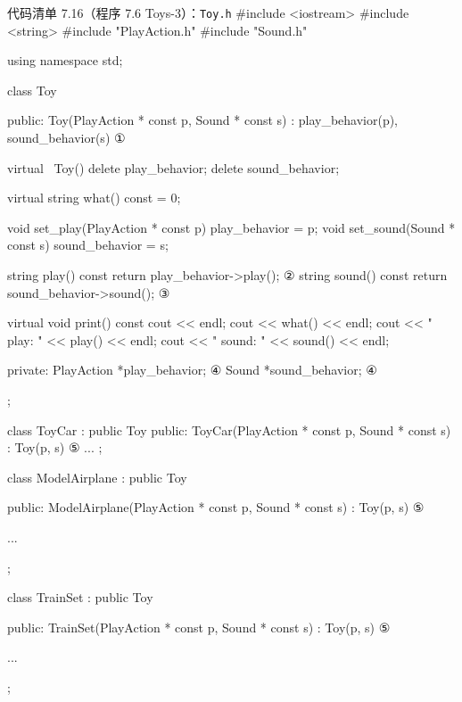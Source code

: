\begin{codeboxt}{代码清单 7.16（程序 7.6 Toys-3）：\texttt{Toy.h}}
#include <iostream>
#include <string>
#include "PlayAction.h"
#include "Sound.h"

using namespace std;

class Toy
{
public:
    Toy(PlayAction * const p, Sound * const s)
        : play_behavior(p), sound_behavior(s) {}                   ①

    virtual ~Toy()
    {
        delete play_behavior;
        delete sound_behavior;
    }

    virtual string what() const = 0;

    void set_play(PlayAction * const p) { play_behavior  = p; }
    void set_sound(Sound * const s)     { sound_behavior = s; }

    string play()  const { return play_behavior->play(); }         ②
    string sound() const { return sound_behavior->sound();}        ③

    virtual void print() const
    {
        cout << endl;
        cout << what() << endl;
        cout << "   play: " << play() << endl;
        cout << "  sound: " << sound() << endl;
    }

private:
    PlayAction *play_behavior;                                     ④
    Sound      *sound_behavior;                                    ④
};

class ToyCar : public Toy
{
public:
    ToyCar(PlayAction * const p, Sound * const s) : Toy(p, s) {}   ⑤
    ...
};

class ModelAirplane : public Toy
{
public:
    ModelAirplane(PlayAction * const p, Sound * const s)
        : Toy(p, s) {}                                             ⑤

    ...
};

class TrainSet : public Toy
{
public:
    TrainSet(PlayAction * const p, Sound * const s) : Toy(p, s) {} ⑤

    ...
};
\end{codeboxt}
\par
{}\par
{}\par
{}\par
{}\par

